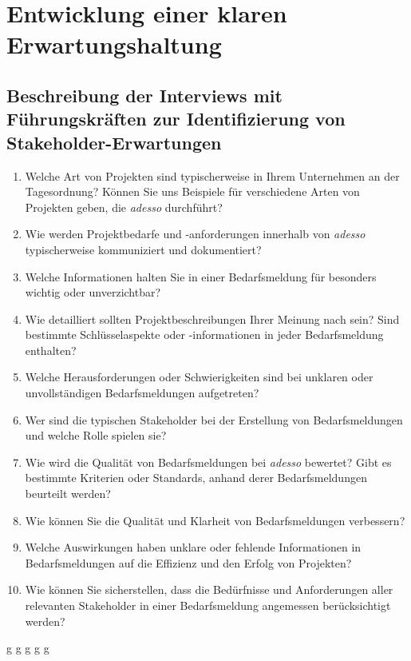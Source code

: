 \chapter{Entwicklung einer klaren Erwartungshaltung}
\label{chap:erwartungshaltung}

\section{Beschreibung der Interviews mit Führungskräften zur Identifizierung von Stakeholder-Erwartungen}
\label{sec:beschreibung-der-interviews}

\begin{enumerate}
	\item Welche Art von Projekten sind typischerweise in Ihrem Unternehmen an der Tagesordnung? Können Sie uns Beispiele für verschiedene Arten von Projekten geben, die \emph{adesso} durchführt?
	\item Wie werden Projektbedarfe und -anforderungen innerhalb von \emph{adesso} typischerweise kommuniziert und dokumentiert?
	\item Welche Informationen halten Sie in einer Bedarfsmeldung für besonders wichtig oder unverzichtbar?
	\item Wie detailliert sollten Projektbeschreibungen Ihrer Meinung nach sein? Sind bestimmte Schlüsselaspekte oder -informationen in jeder Bedarfsmeldung enthalten?
	\item Welche Herausforderungen oder Schwierigkeiten sind bei unklaren oder unvollständigen Bedarfsmeldungen aufgetreten?
	\item Wer sind die typischen Stakeholder bei der Erstellung von Bedarfsmeldungen und welche Rolle spielen sie?
	\item Wie wird die Qualität von Bedarfsmeldungen bei \emph{adesso} bewertet? Gibt es bestimmte Kriterien oder Standards, anhand derer Bedarfsmeldungen beurteilt werden?
	\item Wie können Sie die Qualität und Klarheit von Bedarfsmeldungen verbessern?
	\item Welche Auswirkungen haben unklare oder fehlende Informationen in Bedarfsmeldungen auf die Effizienz und den Erfolg von Projekten?
	\item Wie können Sie sicherstellen, dass die Bedürfnisse und Anforderungen aller relevanten Stakeholder in einer Bedarfsmeldung angemessen berücksichtigt werden?
\end{enumerate}
\newpage
g
\newpage
g
\newpage
g
\newpage
g
\newpage
g
\newpage


